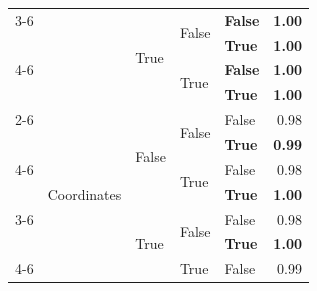 \documentclass{article}
\begin{document}
\begin{table}
\begin{center}
{\begin{tabular}{@{}lllllr@{}}
    \cmidrule{3-6}
                                                        &                                   & \multirow[c]{4}{*}{True}  & \multirow[c]{2}{*}{False} & \textbf{False}        & \textbf{1.00} \\
                                                        &                                   &                           &                           & \textbf{True}         & \textbf{1.00} \\
    \cmidrule{4-6}
                                                        &                                   &                           & \multirow[c]{2}{*}{True}  & \textbf{False}        & \textbf{1.00} \\
                                                        &                                   &                           &                           & \textbf{True}         & \textbf{1.00} \\
    \cmidrule{2-6}
                                                        & \multirow[c]{9}{*}{Coordinates}   & \multirow[c]{4}{*}{False} & \multirow[c]{2}{*}{False} & False                 & 0.98 \\
                                                        &                                   &                           &                           & \textbf{True}         & \textbf{0.99} \\
    \cmidrule{4-6}
                                                        &                                   &                           & \multirow[c]{2}{*}{True}  & False                 & 0.98 \\
                                                        &                                   &                           &                           & \textbf{True}         & \textbf{1.00} \\
    \cmidrule{3-6}
                                                        &                                   & \multirow[c]{4}{*}{True}  & \multirow[c]{2}{*}{False} & False                 & 0.98 \\
                                                        &                                   &                           &                           & \textbf{True}         & \textbf{1.00} \\
    \cmidrule{4-6}
                                                        &                                   &                           & \multirow[c]{2}{*}{True}  & False                 & 0.99 \\

\end{tabular}}
\end{center}
\end{table}
\end{document}
